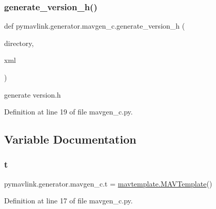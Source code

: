 \subsubsection{\texorpdfstring{generate\_version\_h()}{generate\_version\_h()}}
{\footnotesize\ttfamily def pymavlink.\+generator.\+mavgen\+\_\+c.\+generate\+\_\+version\+\_\+h (\begin{DoxyParamCaption}\item[{}]{directory,  }\item[{}]{xml }\end{DoxyParamCaption})}

\begin{DoxyVerb}generate version.h\end{DoxyVerb}
 

Definition at line 19 of file mavgen\+\_\+c.\+py.



\subsection{Variable Documentation}
\mbox{\label{namespacepymavlink_1_1generator_1_1mavgen__c_a774f91c5f8caa0b1c80610c28d05277b}} 
\subsubsection{\texorpdfstring{t}{t}}
{\footnotesize\ttfamily pymavlink.\+generator.\+mavgen\+\_\+c.\+t = \mbox{\hyperlink{classpymavlink_1_1generator_1_1mavtemplate_1_1MAVTemplate}{mavtemplate.\+M\+A\+V\+Template}}()}



Definition at line 17 of file mavgen\+\_\+c.\+py.

